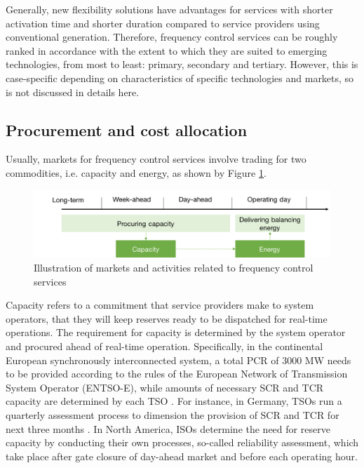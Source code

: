 Generally, new flexibility solutions have advantages for services with shorter activation time and shorter duration compared to service providers using conventional generation. Therefore, frequency control services can be roughly ranked in accordance with the extent to which they are suited to emerging technologies, from most to least: primary, secondary and tertiary. However, this is case-specific depending on characteristics of specific technologies and markets, so is not discussed in details here.

\subsection{Procurement and cost allocation}

Usually, markets for frequency control services involve trading for two commodities, i.e. capacity and energy, as shown by Figure \ref{fig:FCR_market}. 

\begin{figure}[h!]
	\centering
	\includegraphics[width=0.95\linewidth]{Figures/FCR_market}
	\caption{Illustration of markets and activities related to frequency control services}
	\label{fig:FCR_market}
\end{figure}

Capacity refers to a commitment that service providers make to system operators, that they will keep reserves ready to be dispatched for real-time operations. The requirement for capacity is determined by the system operator and procured ahead of real-time operation. Specifically, in the continental European synchronously interconnected system, a total PCR of 3000 MW needs to be provided according to the rules of the European Network of Transmission System Operator (ENTSO-E), while amounts of necessary SCR and TCR capacity are determined by each TSO \cite{ENTSO-e_handbook}. For instance, in Germany, TSOs run a quarterly assessment process to dimension the provision of SCR and TCR for next three months \cite{ConsentecGmbH2014}. In North America, ISOs determine the need for reserve capacity by conducting their own processes, so-called reliability assessment, which take place after gate closure of day-ahead market and before each operating hour\cite{EllisonJ.F.TesfatsionL.S.LooseV.W.Byrne2012}. 

